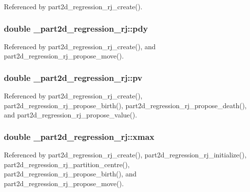 Referenced by part2d\+\_\+regression\+\_\+rj\+\_\+create().

\subsubsection[{\texorpdfstring{pdy}{pdy}}]{\setlength{\rightskip}{0pt plus 5cm}double \+\_\+part2d\+\_\+regression\+\_\+rj\+::pdy}\hypertarget{struct__part2d__regression__rj_ae554fea517847483b54523c0a53b8d69}{}\label{struct__part2d__regression__rj_ae554fea517847483b54523c0a53b8d69}


Referenced by part2d\+\_\+regression\+\_\+rj\+\_\+create(), and part2d\+\_\+regression\+\_\+rj\+\_\+propose\+\_\+move().

\subsubsection[{\texorpdfstring{pv}{pv}}]{\setlength{\rightskip}{0pt plus 5cm}double \+\_\+part2d\+\_\+regression\+\_\+rj\+::pv}\hypertarget{struct__part2d__regression__rj_aa493607e559cd57220e3359b5c083e3f}{}\label{struct__part2d__regression__rj_aa493607e559cd57220e3359b5c083e3f}


Referenced by part2d\+\_\+regression\+\_\+rj\+\_\+create(), part2d\+\_\+regression\+\_\+rj\+\_\+propose\+\_\+birth(), part2d\+\_\+regression\+\_\+rj\+\_\+propose\+\_\+death(), and part2d\+\_\+regression\+\_\+rj\+\_\+propose\+\_\+value().

\subsubsection[{\texorpdfstring{xmax}{xmax}}]{\setlength{\rightskip}{0pt plus 5cm}double \+\_\+part2d\+\_\+regression\+\_\+rj\+::xmax}\hypertarget{struct__part2d__regression__rj_a3c73d6f7af4e89b4f38c63d27ebc9855}{}\label{struct__part2d__regression__rj_a3c73d6f7af4e89b4f38c63d27ebc9855}


Referenced by part2d\+\_\+regression\+\_\+rj\+\_\+create(), part2d\+\_\+regression\+\_\+rj\+\_\+initialize(), part2d\+\_\+regression\+\_\+rj\+\_\+partition\+\_\+centre(), part2d\+\_\+regression\+\_\+rj\+\_\+propose\+\_\+birth(), and part2d\+\_\+regression\+\_\+rj\+\_\+propose\+\_\+move().

